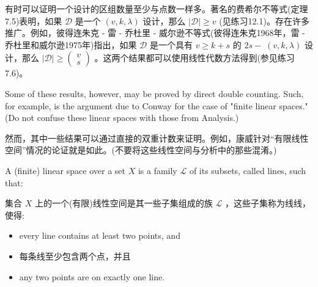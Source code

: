 \documentclass[10pt]{article}
\begin{document}
\begin{tcolorbox}\relax
有时可以证明一个设计的区组数量至少与点数一样多。著名的费希尔不等式(定理7.5)表明，如果 \(\mathcal{D}\) 是一个 \(\left( {v,k,\lambda }\right)\) 设计，那么 \(\left| \mathcal{D}\right|  \geq  v\) (见练习12.1)。存在许多推广。例如，彼得连朱克 - 雷 - 乔杜里 - 威尔逊不等式(彼得连朱克1968年，雷 - 乔杜里和威尔逊1975年)指出，如果 \(\mathcal{D}\) 是一个具有 \(v \geq  k + s\) 的 \({2s} - \; \left( {v,k,\lambda }\right)\) 设计，那么 \(\left| \mathcal{D}\right|  \geq  \left( \begin{array}{l} v \\  s \end{array}\right)\) 。这两个结果都可以使用线性代数方法得到(参见练习7.6)。
\end{tcolorbox}

Some of these results, however, may be proved by direct double counting. Such, for example, is the argument due to Conway for the case of "finite linear spaces." (Do not confuse these linear spaces with those from Analysis.)

\begin{tcolorbox}\relax
然而，其中一些结果可以通过直接的双重计数来证明。例如，康威针对“有限线性空间”情况的论证就是如此。(不要将这些线性空间与分析中的那些混淆。)
\end{tcolorbox}

A (finite) linear space over a set \(X\) is a family \(\mathcal{L}\) of its subsets, called lines, such that:

\begin{tcolorbox}\relax
集合 \(X\) 上的一个(有限)线性空间是其一些子集组成的族 \(\mathcal{L}\) ，这些子集称为线线，使得:
\end{tcolorbox}

\begin{itemize}\relax
\item\relax every line contains at least two points, and
\end{itemize}

\begin{tcolorbox}\relax
\begin{itemize}\relax
\item\relax 每条线至少包含两个点，并且
\end{itemize}
\end{tcolorbox}

\begin{itemize}\relax
\item\relax any two points are on exactly one line.
\end{itemize}
\end{document}

